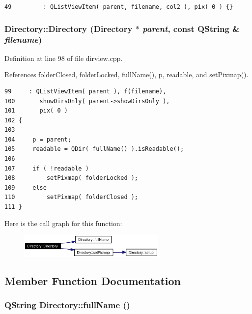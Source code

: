 \footnotesize\begin{verbatim}49         : QListViewItem( parent, filename, col2 ), pix( 0 ) {}
\end{verbatim}\normalsize 
{}
\subsubsection{\setlength{\rightskip}{0pt plus 5cm}Directory::Directory ({\bf Directory} $\ast$ {\em parent}, const QString \& {\em filename})}\label{classDirectory_Directorya2}




Definition at line 98 of file dirview.cpp.

References folder\-Closed, folder\-Locked, full\-Name(), p, readable, and set\-Pixmap().



\footnotesize\begin{verbatim}99     : QListViewItem( parent ), f(filename),
100       showDirsOnly( parent->showDirsOnly ),
101       pix( 0 )
102 {
103     
104     p = parent;
105     readable = QDir( fullName() ).isReadable();
106 
107     if ( !readable )
108         setPixmap( folderLocked );
109     else
110         setPixmap( folderClosed );
111 }
\end{verbatim}\normalsize 


Here is the call graph for this function:\begin{figure}[H]
\begin{center}
\leavevmode
\includegraphics[width=205pt]{classDirectory_Directorya2_cgraph}
\end{center}
\end{figure}


\subsection{Member Function Documentation}
\subsubsection{\setlength{\rightskip}{0pt plus 5cm}QString Directory::full\-Name ()}\label{classDirectory_Directorya4}




